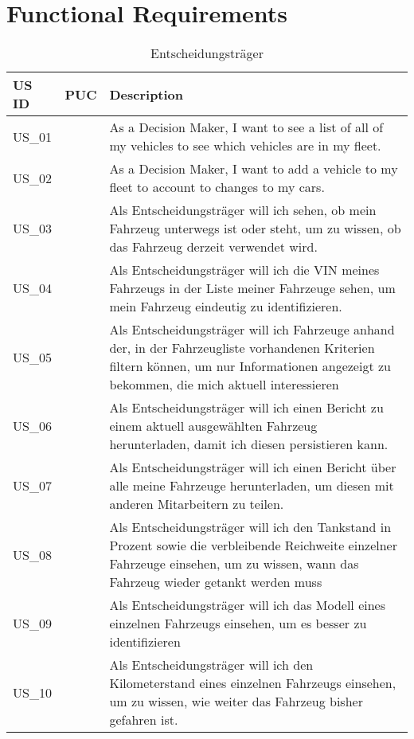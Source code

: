 \chapter{Functional Requirements}

  \sffamily
  \begin{footnotesize}
    \begin{longtable}[i i L]{ p{} p{} p{} }
      \caption                       %
          {Entscheidungsträger} %
          \\
      \toprule
      \textbf{US ID} & \textbf{PUC} & \textbf{Description} \\
      \midrule
      US\_01 & & As a Decision Maker, I want to see a list of all of my vehicles to see which vehicles are in my fleet.\\
      US\_02 & & As a Decision Maker, I want to add a vehicle to my fleet to account to changes to my cars. \\
      US\_03 & & Als Entscheidungsträger will ich sehen, ob mein Fahrzeug unterwegs ist oder steht, um zu wissen, ob das Fahrzeug derzeit verwendet wird. \\
      US\_04 & & Als Entscheidungsträger will ich die VIN meines Fahrzeugs in der Liste meiner Fahrzeuge sehen, um mein Fahrzeug eindeutig zu identifizieren. \\
      US\_05 & & Als Entscheidungsträger will ich Fahrzeuge anhand der, in der Fahrzeugliste vorhandenen Kriterien filtern können, um nur Informationen angezeigt zu bekommen, die mich aktuell interessieren \\
      US\_06 & & Als Entscheidungsträger will ich einen Bericht zu einem aktuell ausgewählten Fahrzeug herunterladen, damit ich diesen persistieren kann. \\
      US\_07 & & Als Entscheidungsträger will ich einen Bericht über alle meine Fahrzeuge herunterladen, um diesen mit anderen Mitarbeitern zu teilen. \\
      US\_08 & & Als Entscheidungsträger will ich den Tankstand in Prozent sowie die verbleibende Reichweite einzelner Fahrzeuge einsehen, um zu wissen, wann das Fahrzeug wieder getankt werden muss \\ 
      US\_09 & & Als Entscheidungsträger will ich das Modell eines einzelnen Fahrzeugs einsehen, um es besser zu identifizieren \\
      US\_10 & & Als Entscheidungsträger will ich den Kilometerstand eines einzelnen Fahrzeugs einsehen, um zu wissen, wie weiter das Fahrzeug bisher gefahren ist. \\

\end{longtable}
\end{footnotesize}
